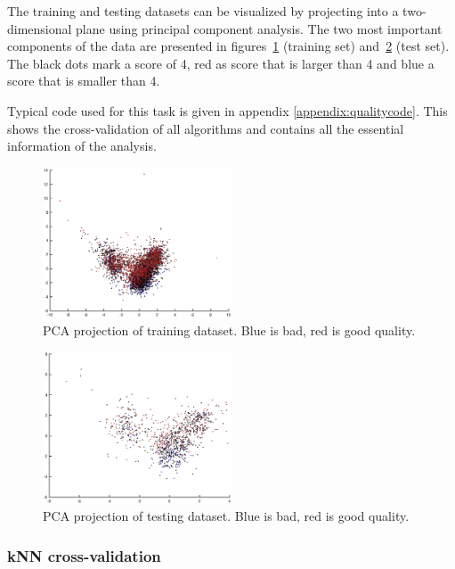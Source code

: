 \documentclass[twoside]{article}
\begin{document}
\begin{multicols}{2}
The training and testing datasets can be visualized by projecting into a two-dimensional plane using principal component analysis. The 
two most important components of the data are presented in figures~\ref{fig:quality_training_pca} (training set) and~\ref{fig:quality_testing_pca}
(test set).
The black dots mark a score of 4, red as score that is larger than 4 and blue a score that is smaller than 4.

Typical code used for this task is given in appendix \ref{appendix:qualitycode}. This shows the cross-validation of all algorithms and
contains all the essential information of the analysis.

\begin{figure}[H]
\centering
\includegraphics[width=0.5\textwidth]{qpcatraining}
\caption{PCA projection of training dataset. Blue is bad, red is good quality.}
\label{fig:quality_training_pca}
\end{figure}

\begin{figure}[H]
\centering
\includegraphics[width=0.5\textwidth]{qpcatesting}
\caption{PCA projection of testing dataset. Blue is bad, red is good quality.}
\label{fig:quality_testing_pca}
\end{figure}

\subsubsection{kNN cross-validation}


\end{multicols}
\end{document}

